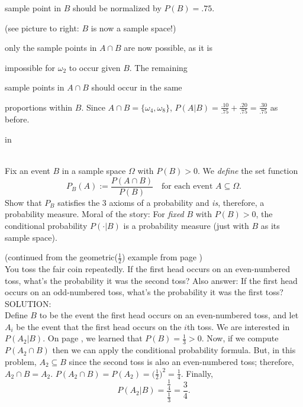 \documentclass[12pt]{article}
\begin{document}
\noindent sample point in $B$ should be normalized by $P(B)=.75$.

\noindent (see picture to right: $B$ is now a sample space!)

\noindent only the sample points in $A\cap B$ are now possible, as it is

\noindent impossible for $\omega_2$ to occur given $B$. The remaining

\noindent sample points in $A\cap B$ should occur in the same

\noindent proportions within $B$.  Since $A\cap B = \{\omega_4,\omega_8\}$,
$P(A|B) = \frac {.10}{.75}+\frac {.20}{.75} = \frac {.30}{.75}$ as before.



 in

\\
Fix an event $B$ in a sample space $\Omega$ with $P(B)>0$.  We {\em define} the set function
$$P_B(A) := \dfrac {P(A\cap B)}{P(B)}\quad\mbox{for each event }A\subseteq \Omega.$$
Show that
$P_B$ satisfies the 3 axioms of a probability and {\em is}, therefore, a probability measure.
Moral of the story: For {\em fixed} $B$ with $P(B)>0$, the conditional probability $P(\cdot|B)$ is a probability measure (just with $B$ as its sample space).\\



\newpage





 (continued from the geometric($\frac 12$) example from page \pageref{geomfaircoin})\\
\noindent You toss the fair coin repeatedly. If the first head occurs on an even-numbered toss, what's the probability it was the second toss?
Also answer: If the first head occurs on an odd-numbered toss, what's the probability it was the first toss?\\

\noindent SOLUTION:\\
Define $B$ to be the event the first head occurs on an even-numbered toss, and let
$A_i$ be the event that the first head occurs on the $i$th toss.  We are interested in
$P(A_2|B)$.  On page \pageref{geomfaircoin}, we learned that $P(B) = \frac 13 > 0$.
Now, if we compute $P(A_2\cap B)$ then we can apply the conditional probability formula.
But, in this problem, $A_2\subseteq B$ since the second toss is also an even-numbered toss; therefore, $A_2\cap B=A_2$.
$P(A_2\cap B) = P(A_2) = \big(\frac 12\big)^2 = \frac 14$. Finally,
$$P(A_2|B) = \dfrac {\frac 14}{\frac 13}=\dfrac 34.$$
\end{document}
